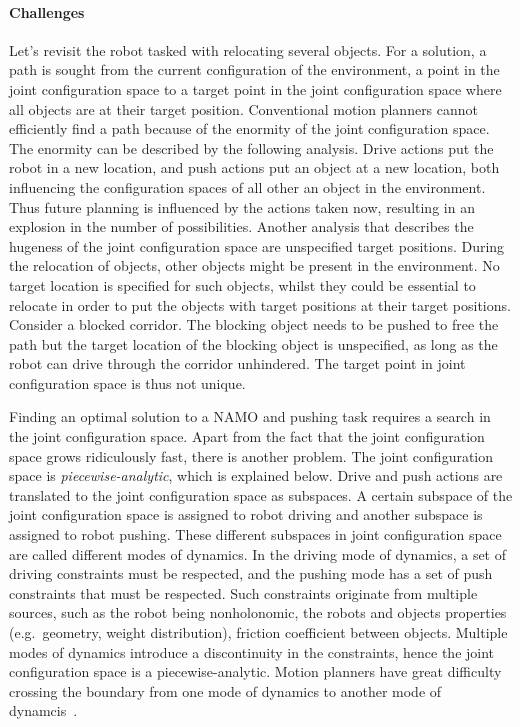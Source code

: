 \paragraph{Challenges}
Let's revisit the robot tasked with relocating several objects. For a solution, a path is sought from the current configuration of the environment, a point in the joint configuration space to a target point in the joint configuration space where all objects are at their target position. Conventional motion planners cannot efficiently find a path because of the enormity of the joint configuration space. The enormity can be described by the following analysis. Drive actions put the robot in a new location, and push actions put an object at a new location, both influencing the configuration spaces of all other an object in the environment. Thus future planning is influenced by the actions taken now, resulting in an explosion in the number of possibilities. Another analysis that describes the hugeness of the joint configuration space are unspecified target positions. During the relocation of objects, other objects might be present in the environment. No target location is specified for such objects, whilst they could be essential to relocate in order to put the objects with target positions at their target positions. Consider a blocked corridor. The blocking object needs to be pushed to free the path but the target location of the blocking object is unspecified, as long as the robot can drive through the corridor unhindered. The target point in joint configuration space is thus not unique.\bs

Finding an optimal solution to a \ac{NAMO} and pushing task requires a search in the joint configuration space. Apart from the fact that the joint configuration space grows ridiculously fast, there is another problem. The joint configuration space is \textit{piecewise-analytic}, which is explained below. Drive and push actions are translated to the joint configuration space as subspaces. A certain subspace of the joint configuration space is assigned to robot driving and another subspace is assigned to robot pushing. These different subspaces in joint configuration space are called different modes of dynamics. In the driving mode of dynamics, a set of driving constraints must be respected, and the pushing mode has a set of push constraints that must be respected. Such constraints originate from multiple sources, such as the robot being nonholonomic, the robots and objects properties (e.g.~geometry, weight distribution), friction coefficient between objects. Multiple modes of dynamics introduce a discontinuity in the constraints, hence the joint configuration space is a piecewise-analytic. Motion planners have great difficulty crossing the boundary from one mode of dynamics to another mode of dynamcis~\cite{vega-brown_asymptotically_2020}.\bs

